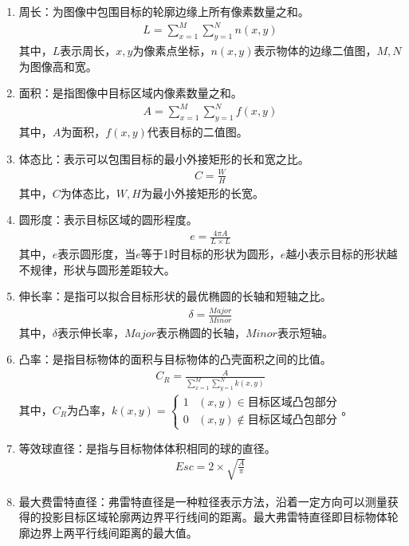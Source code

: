 \begin{enumerate}
\item 周长：为图像中包围目标的轮廓边缘上所有像素数量之和。
  \begin{eqnarray}
  L = \sum^{M}_{x=1}\sum^{N}_{y=1}n(x,y)
  \end{eqnarray}
  其中，$L$表示周长，$x,y$为像素点坐标，$n(x,y)$表示物体的边缘二值图，$M,N$为图像高和宽。
\item 面积：是指图像中目标区域内像素数量之和。
  \begin{eqnarray}
  A = \sum^{M}_{x=1}\sum^{N}_{y=1}f(x,y)
  \end{eqnarray}
  其中，$A$为面积，$f(x,y)$代表目标的二值图。
\item 体态比：表示可以包围目标的最小外接矩形的长和宽之比。
  \begin{eqnarray}
  C = \frac{W}{H}
  \end{eqnarray}
  其中，$C$为体态比，$W,H$为最小外接矩形的长宽。
\item 圆形度：表示目标区域的圆形程度。
  \begin{eqnarray}
  e = \frac{4\pi A}{L \times L}
  \end{eqnarray}
  其中，$e$表示圆形度，当$e$等于1时目标的形状为圆形，$e$越小表示目标的形状越不规律，形状与圆形差距较大。
\item 伸长率：是指可以拟合目标形状的最优椭圆的长轴和短轴之比。
  \begin{eqnarray}
  \delta = \frac{Major}{Minor}
  \end{eqnarray}
  其中，$\delta$表示伸长率，$Major$表示椭圆的长轴，$Minor$表示短轴。
\item 凸率：是指目标物体的面积与目标物体的凸壳面积之间的比值。
  \begin{eqnarray}
  C_{R} = \frac{A}{\sum^{M}_{x=1}\sum^{N}_{y=1}k(x,y)}
  \end{eqnarray}
  其中，$C_R$为凸率，$k(x,y)=\left\{ \begin{array}{ll} 1 & (x,y)\in \textrm{目标区域凸包部分}\\ 0 & (x,y)\notin \textrm{目标区域凸包部分} \end{array} \right.$。
\item 等效球直径：是指与目标物体体积相同的球的直径。
  \begin{eqnarray}
  Esc = 2 \times \sqrt{\frac{A}{\pi}}
  \end{eqnarray}
\item 最大费雷特直径：弗雷特直径是一种粒径表示方法，沿着一定方向可以测量获得的投影目标区域轮廓两边界平行线间的距离。最大弗雷特直径即目标物体轮廓边界上两平行线间距离的最大值。
\end{enumerate}

